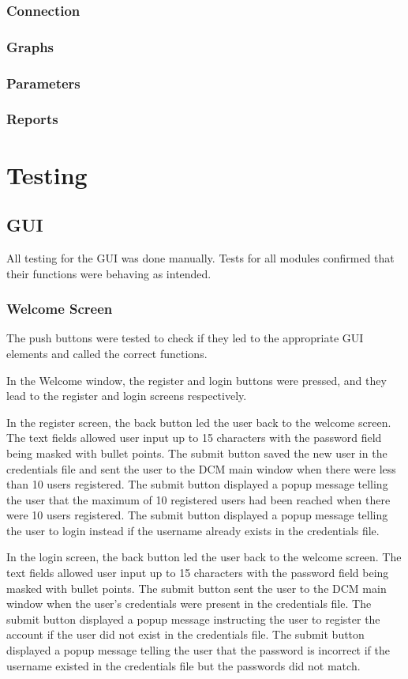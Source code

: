 \documentclass[12pt]{article}
\begin{document}
\subsubsection{Connection}
\subsubsection{Graphs}
\subsubsection{Parameters}
\subsubsection{Reports}
\newpage
\section{Testing}
\subsection{GUI}
All testing for the GUI was done manually. Tests for all modules confirmed that their functions were behaving as intended.

\subsubsection{Welcome Screen}\label{Testing:WelcomeScreen}
The push buttons were tested to check if they led to the appropriate GUI elements and called the correct functions. 

In the Welcome window, the register and login buttons were pressed, and they lead to the register and login screens respectively. 

In the register screen, the back button led the user back to the welcome screen. The text fields allowed user input up to 15 characters with the password field being masked with bullet points. The submit button saved the new user in the credentials file and sent the user to the DCM main window when there were less than 10 users registered. The submit button displayed a popup message telling the user that the maximum of 10 registered users had been reached when there were 10 users registered. The submit button displayed a popup message telling the user to login instead if the username already exists in the credentials file.

In the login screen, the back button led the user back to the welcome screen. The text fields allowed user input up to 15 characters with the password field being masked with bullet points. The submit button sent the user to the DCM main window when the user's credentials were present in the credentials file. The submit button displayed a popup message instructing the user to register the account if the user did not exist in the credentials file. The submit button displayed a popup message telling the user that the password is incorrect if the username existed in the credentials file but the passwords did not match.
\end{document}
